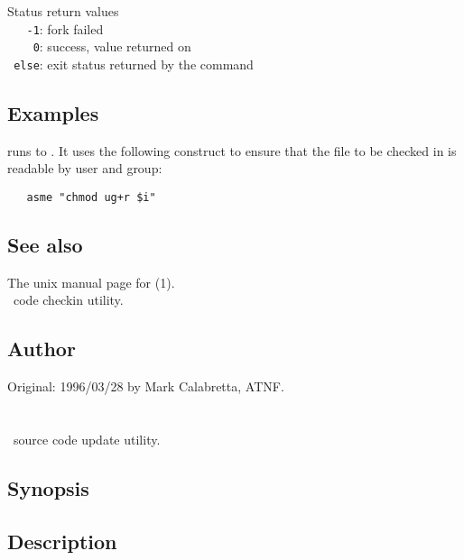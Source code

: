 Status return values
\\ \verb+   -1+:  fork failed
\\ \verb+    0+:  success, value returned on 
\\ \verb+ else+:  exit status returned by the command
 
\subsection*{Examples}
 
 runs  to .  It uses the following
construct to ensure that the file to be checked in is readable by user and
group:

\begin{verbatim}
   asme "chmod ug+r $i"
\end{verbatim}
 
 
\subsection*{See also}
 
The unix manual page for (1).\\
 \aipspp\ code checkin utility.
 
\subsection*{Author}
 
Original: 1996/03/28 by Mark Calabretta, ATNF.


\newpage
\section{}
\label{au}

\aipspp\ source code update utility.

\subsection*{Synopsis}

\begin{synopsis}
\end{synopsis}

\subsection*{Description}

